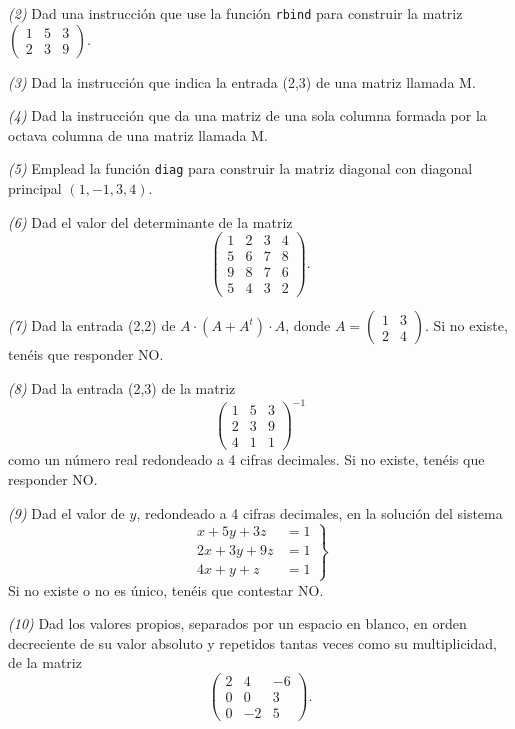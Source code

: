 \documentclass[]{book}
\theoremstyle{definition}
\theoremstyle{definition}
\theoremstyle{definition}
\theoremstyle{remark}
\begin{document}
\emph{(2)} Dad una instrucción que use la función \texttt{rbind} para construir la matriz
\(\left(\begin{array}{ccc} 1 & 5 & 3\\ 2 & 3 & 9\end{array} \right)\).

\emph{(3)} Dad la instrucción que indica la entrada (2,3) de una matriz llamada M.

\emph{(4)} Dad la instrucción que da una matriz de una sola columna formada por la octava columna de una matriz llamada M.

\emph{(5)} Emplead la función \texttt{diag} para construir la matriz diagonal con diagonal principal \((1,-1,3,4)\).

\emph{(6)} Dad el valor del determinante de la matriz \[\left(\begin{array}{cccc}
1 & 2 & 3 & 4\\ 5 & 6 & 7 & 8 \\ 9 & 8 & 7 & 6\\ 5 & 4 & 3 & 2\end{array} \right).\]

\emph{(7)} Dad la entrada (2,2) de \(A\cdot (A+ A^t)\cdot A\), donde \(A=\left(\begin{array}{cc} 1 & 3 \\ 2 & 4 \end{array} \right)\). Si no existe, tenéis que responder NO.

\emph{(8)} Dad la entrada (2,3) de la matriz \[\left(\begin{array}{ccc} 1 & 5 & 3\\ 2 & 3 & 9\\ 4 & 1 & 1\end{array} \right)^{-1}\] como un número real redondeado a 4 cifras decimales. Si no existe, tenéis que responder NO.

\emph{(9)} Dad el valor de \(y\), redondeado a 4 cifras decimales, en la solución del sistema
\[
\left.\begin{array}{ll} x+5y+3z & = 1\\ 2x+3y+9z & =1\\ 4x+y+z & = 1\end{array}
\right\}
\]
Si no existe o no es único, tenéis que contestar NO.

\emph{(10)} Dad los valores propios, separados por un espacio en blanco, en orden decreciente de su valor absoluto y repetidos tantas veces como su multiplicidad, de la matriz
\[\left(\begin{array}{ccc}
2 & 4 & -6 \\ 0 & 0 & 3 \\ 0 & -2 & 5
\end{array} \right).\]
\end{document}
